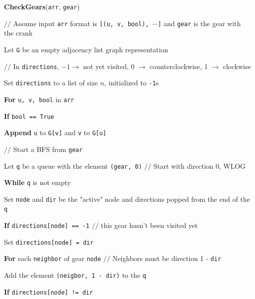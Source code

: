 \documentclass[11pt]{article}
\begin{document}
\begin{enumerate}[leftmargin=*,start=0]
\hfill

\textbf{CheckGears}(\verb|arr|, \verb|gear|)

\hspace{5mm} $//$ Assume input \verb|arr| format is \verb|[(u, v, bool), |$\cdots$\verb|]| and \verb|gear| is the gear with the crank

\hspace{5mm} Let \verb|G| be an empty adjacency list graph representation

\hspace{5mm} $//$ In \verb|directions|, $-1 \to$ not yet visited, 0 $\to$ counterclockwise, 1 $\to$ clockwise

\hspace{5mm} Set \verb|directions| to a list of size $n$, initialized to \verb|-1|s

\hspace{5mm} \textbf{For} \verb|u, v, bool| in \verb|arr|

\hspace{5mm} \textbf{If} \verb|bool == True|

\hspace{10mm} \textbf{Append} \verb|u| to \verb|G[v]| and \verb|v| to \verb|G[u]|

\hspace{5mm} $//$ Start a BFS from \verb|gear|

\hspace{5mm} Let \verb|q| be a queue with the element \verb|(gear, 0)| $//$ Start with direction 0, WLOG

\hspace{5mm} \textbf{While} \verb|q| is not empty

\hspace{10mm} Set \verb|node| and \verb|dir| be the "active" node and directions popped from the end of the \verb|q|

\hspace{10mm} \textbf{If} \verb|directions[node] == -1| $//$ this gear hasn't been visited yet

\hspace{15mm} Set \verb|directions[node] = dir|

\hspace{15mm} \textbf{For} each \verb|neighbor| of gear \verb|node| $//$ Neighbors must be direction 1 - \verb|dir|

\hspace{20mm} Add the element \verb|(neigbor, 1 - dir)| to the \verb|q|

\hspace{10mm} \textbf{If} \verb|directions[node] != dir|


\end{enumerate}
\end{document}
